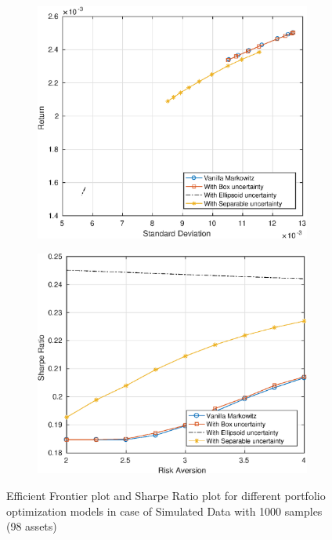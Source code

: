 \documentclass[12pt]{article}
\numberwithin{equation}{section}
\begin{document}
\begin{figure}[h]
\centering
\begin{subfigure}{.5\textwidth}
  \centering
  \includegraphics[width=.8\linewidth]{100_ef_ideal_range_1000_sim.eps}
\end{subfigure}%
\begin{subfigure}{.5\textwidth}
  \centering
  \includegraphics[width=.8\linewidth]{100_sr_ideal_range_1000_sim.eps}
\end{subfigure}
\caption{Efficient Frontier plot and Sharpe Ratio plot for different portfolio optimization models in case of Simulated Data with 1000 samples (98 assets)}
\label{fig:4}
\end{figure}
\end{document}
